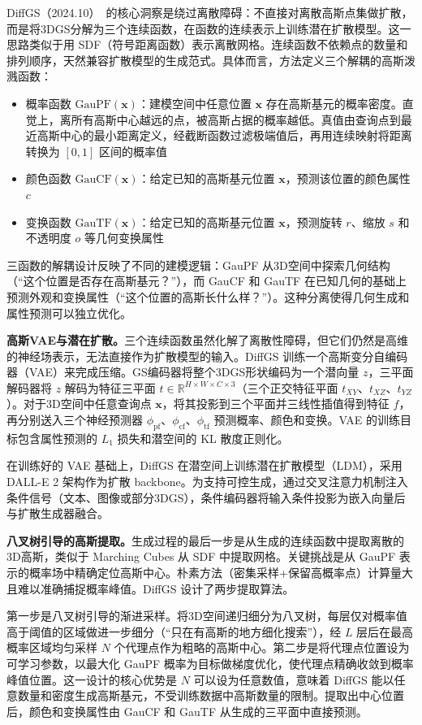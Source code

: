 DiffGS（2024.10）~\cite{2410_19657}的核心洞察是绕过离散障碍：不直接对离散高斯点集做扩散，而是将3DGS分解为三个连续函数，在函数的连续表示上训练潜在扩散模型。这一思路类似于用 SDF（符号距离函数）表示离散网格。连续函数不依赖点的数量和排列顺序，天然兼容扩散模型的生成范式。具体而言，方法定义三个解耦的高斯泼溅函数：
\begin{itemize}
\item 概率函数 $\mathrm{GauPF}(\mathbf{x})$：建模空间中任意位置 $\mathbf{x}$ 存在高斯基元的概率密度。直觉上，离所有高斯中心越远的点，被高斯占据的概率越低。真值由查询点到最近高斯中心的最小距离定义，经截断函数过滤极端值后，再用连续映射将距离转换为 $[0,1]$ 区间的概率值
\item 颜色函数 $\mathrm{GauCF}(\mathbf{x})$：给定已知的高斯基元位置 $\mathbf{x}$，预测该位置的颜色属性 $c$
\item 变换函数 $\mathrm{GauTF}(\mathbf{x})$：给定已知的高斯基元位置 $\mathbf{x}$，预测旋转 $r$、缩放 $s$ 和不透明度 $o$ 等几何变换属性
\end{itemize}
三函数的解耦设计反映了不同的建模逻辑：GauPF 从3D空间中探索几何结构（``这个位置是否存在高斯基元？''），而 GauCF 和 GauTF 在已知几何的基础上预测外观和变换属性（``这个位置的高斯长什么样？''）。这种分离使得几何生成和属性预测可以独立优化。

\textbf{高斯VAE与潜在扩散。}三个连续函数虽然化解了离散性障碍，但它们仍然是高维的神经场表示，无法直接作为扩散模型的输入。DiffGS 训练一个高斯变分自编码器（VAE）来完成压缩。GS编码器将整个3DGS形状编码为一个潜向量 $z$，三平面解码器将 $z$ 解码为特征三平面 $t \in \mathbb{R}^{H \times W \times C \times 3}$（三个正交特征平面 $t_{XY}$、$t_{XZ}$、$t_{YZ}$）。对于3D空间中任意查询点 $\mathbf{x}$，将其投影到三个平面并三线性插值得到特征 $f$，再分别送入三个神经预测器 $\phi_{\mathrm{pf}}$、$\phi_{\mathrm{cf}}$、$\phi_{\mathrm{tf}}$ 预测概率、颜色和变换。VAE 的训练目标包含属性预测的 $L_1$ 损失和潜空间的 KL 散度正则化。

在训练好的 VAE 基础上，DiffGS 在潜空间上训练潜在扩散模型（LDM），采用 DALL-E 2 架构作为扩散 backbone。为支持可控生成，通过交叉注意力机制注入条件信号（文本、图像或部分3DGS），条件编码器将输入条件投影为嵌入向量后与扩散生成器融合。

\textbf{八叉树引导的高斯提取。}生成过程的最后一步是从生成的连续函数中提取离散的3D高斯，类似于 Marching Cubes 从 SDF 中提取网格。关键挑战是从 GauPF 表示的概率场中精确定位高斯中心。朴素方法（密集采样+保留高概率点）计算量大且难以准确捕捉概率峰值。DiffGS 设计了两步提取算法。

第一步是八叉树引导的渐进采样。将3D空间递归细分为八叉树，每层仅对概率值高于阈值的区域做进一步细分（``只在有高斯的地方细化搜索''），经 $L$ 层后在最高概率区域均匀采样 $N$ 个代理点作为粗略的高斯中心。第二步是将代理点位置设为可学习参数，以最大化 GauPF 概率为目标做梯度优化，使代理点精确收敛到概率峰值位置。这一设计的核心优势是 $N$ 可以设为任意数值，意味着 DiffGS 能以任意数量和密度生成高斯基元，不受训练数据中高斯数量的限制。提取出中心位置后，颜色和变换属性由 GauCF 和 GauTF 从生成的三平面中直接预测。

